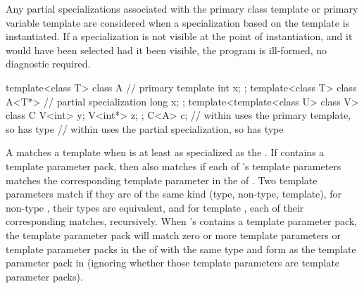 \pnum
Any partial specializations associated with the
primary class template or primary variable template are considered when a
specialization based on the template
is instantiated.
If a specialization is not visible at the point of instantiation,
and it would have been selected had it been visible, the program is ill-formed,
no diagnostic required.
\begin{example}

\begin{codeblock}
template<class T> class A {     // primary template
  int x;
};
template<class T> class A<T*> { // partial specialization
  long x;
};
template<template<class U> class V> class C {
  V<int>  y;
  V<int*> z;
};
C<A> c;             //  within  uses the primary template, so  has type 
                    //  within  uses the partial specialization, so  has type 
\end{codeblock}
\end{example}

\pnum A  matches a template
  when
 is at least as specialized as the  .
If  contains a template parameter pack, then  also matches 
if each of 's template parameters
matches the corresponding template parameter in the
 of .
Two template parameters match if they are of the same kind (type, non-type, template),
for non-type , their types are
equivalent, and for template ,
each of their corresponding  matches, recursively.
When 's  contains a template parameter
pack, the template parameter pack will match zero or more template
parameters or template parameter packs in the  of
 with the same type and form as the template parameter pack in 
(ignoring whether those template parameters are template parameter packs).

